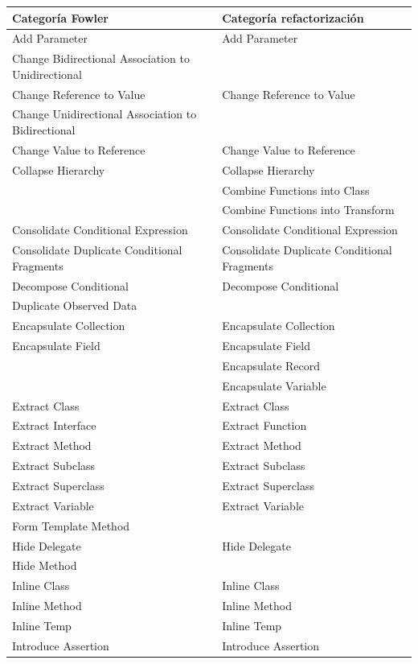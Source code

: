 \documentclass[11pt,a4paper,oneside]{book}
\begin{document}
\begin{longtable}{|p{200pt}|p{200pt}|}
\footnotesize
 Categoría Fowler &Categoría refactorización\\ 
\hline
    Add Parameter & Add Parameter\\ 
    Change Bidirectional Association to Unidirectional & \\ 
    Change Reference to Value & Change Reference to Value\\ 
    Change Unidirectional Association to Bidirectional & \\ 
    Change Value to Reference & Change Value to Reference\\ 
    Collapse Hierarchy & Collapse Hierarchy\\ 
 & Combine Functions into Class\\ 
 & Combine Functions into Transform\\ 
    Consolidate Conditional Expression & Consolidate Conditional Expression\\ 
    Consolidate Duplicate Conditional Fragments & Consolidate Duplicate Conditional Fragments\\ 
    Decompose Conditional & Decompose Conditional\\ 
    Duplicate Observed Data & \\ 
    Encapsulate Collection & Encapsulate Collection\\ 
    Encapsulate Field & Encapsulate Field \\ 
 & Encapsulate Record\\ 
 & Encapsulate Variable\\ 
    Extract Class & Extract Class\\ 
    Extract Interface & Extract Function\\ 
    Extract Method & Extract Method\\ 
    Extract Subclass & Extract Subclass \\ 
    Extract Superclass & Extract Superclass\\ 
    Extract Variable & Extract Variable\\ 
    Form Template Method & \\ 
    Hide Delegate & Hide Delegate\\ 
    Hide Method & \\ 
    Inline Class & Inline Class\\ 
    Inline Method & Inline Method\\ 
    Inline Temp & Inline Temp\\ 
    Introduce Assertion & Introduce Assertion\\ 

\end{longtable}
\end{document}

